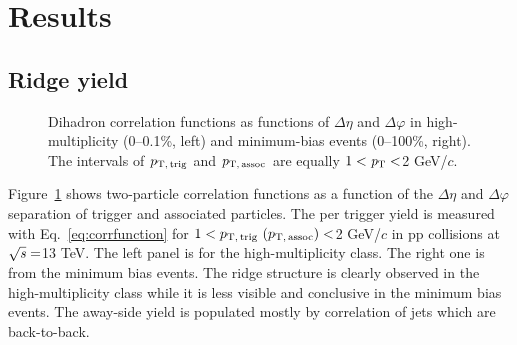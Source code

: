 
\section {Results}
\label{sec:results}

\subsection{Ridge yield}

\begin{figure}[h!]
	\centering
	\caption{ Dihadron correlation functions as functions of $\Delta\eta$ and $\Delta\varphi$ in high-multiplicity (0--0.1\%, left) and minimum-bias events (0--100\%, right). The intervals of $p_\mathrm{T,\,trig}$ and $p_\mathrm{T,\,assoc}$ are equally $1 < \it{p}_{\rm{T}} < $2 GeV/$c$. }
	\label{fig:PlotCorrMBHMT}
\end{figure}

Figure~\ref{fig:PlotCorrMBHMT} shows two-particle correlation functions as a function of the $\Delta \eta$ and $\Delta \varphi$ separation of trigger and associated particles. The per trigger yield is measured with Eq.~\ref{eq:corrfunction} for $1 < p_\mathrm{T,\,trig}~\mathrm (p_\mathrm{T,\,assoc}) < $2 GeV/$c$ in pp collisions at $\sqrt{\it{s}} = $\unit{13} {\rm{}TeV}. The left panel is for the high-multiplicity class. The right one is from the minimum bias events. The ridge structure is clearly observed in the high-multiplicity class while it is less visible and conclusive in the minimum bias events. The away-side yield is populated mostly by correlation of jets which are back-to-back.

